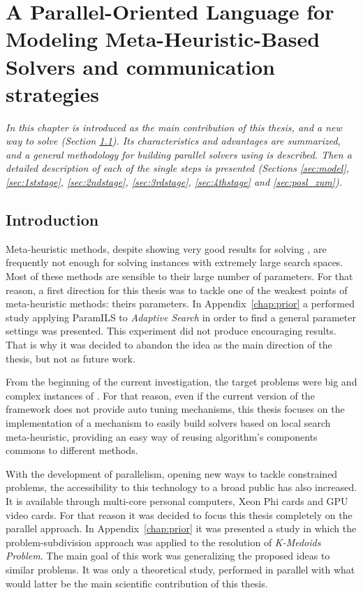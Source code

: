 \chapter{A Parallel-Oriented Language for Modeling Meta-Heuristic-Based Solvers and communication strategies}
\label{chap:posl}
\textit{In this chapter \posl{} is introduced as the main contribution of this thesis, and a new way to solve \csps{} (Section \ref{sec:posl_intro}). Its characteristics and advantages are summarized, and a general methodology for building parallel solvers using \posl{} is described. Then a detailed description of each of the single steps is presented (Sections \ref{sec:model}, \ref{sec:1ststage}, \ref{sec:2ndstage}, \ref{sec:3rdstage}, \ref{sec:4thstage} and \ref{sec:posl_zum}).}
\vfill
\minitoc
\newpage

\section{Introduction}
\label{sec:posl_intro}

Meta-heuristic methods, despite showing very good results for solving \CSPs, are frequently not enough for solving instances with extremely large search spaces. Most of these methods are sensible to their large number of parameters. For that reason, a first direction for this thesis was to tackle one of the weakest points of meta-heuristic methods: theirs parameters. In Appendix~\ref{chap:prior} a performed study applying {\sc ParamILS} to {\it Adaptive Search} in order to find a general parameter settings was presented. This experiment did not produce encouraging results. That is why it was decided to abandon the idea as the main direction of the thesis, but not as future work.

From the beginning of the current investigation, the target problems were big and complex instances of \csps. For that reason, even if the current version of the framework does not provide auto tuning mechanisms, this thesis focuses on the implementation of a mechanism to easily build solvers based on local search meta-heuristic, providing an easy way of reusing algorithm's components commons to different methods.

With the development of parallelism, opening new ways to tackle constrained problems, the accessibility to this technology to a broad public has also increased. It is available through multi-core personal computers, Xeon Phi cards and GPU video cards. For that reason it was decided to focus this thesis completely on the parallel approach. In Appendix~\ref{chap:prior} it was presented a study in which the problem-subdivision approach was applied to the resolution of {\it K-Medoids Problem}. The main goal of this work was generalizing the proposed ideas to similar problems. It was only a theoretical study, performed in parallel with what would latter be the main scientific contribution of this thesis.

